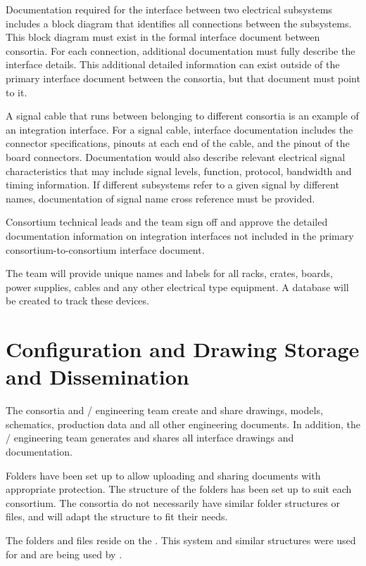 Documentation required for the interface between two electrical
subsystems includes a block diagram that identifies all connections
between the subsystems.  This block diagram must exist in the formal
interface document between consortia.  For each connection, additional
documentation must fully describe the interface details. This
additional detailed information can exist outside of the primary
interface document between the consortia, but that document must point
to it.


A signal cable that runs between  belonging to different
consortia is an example of an integration interface.  For a signal
cable, interface documentation includes the connector specifications,
pinouts at each end of the cable, and the pinout of the board
connectors.  Documentation would also describe relevant electrical
signal characteristics that may include signal levels, function,
protocol, bandwidth and timing information.  If different subsystems
refer to a given signal by different names, documentation of signal
name cross reference must be provided.

Consortium technical leads and the  team sign off
and approve the detailed documentation information on integration
interfaces not included in the primary consortium-to-consortium
interface document.

The  team will provide unique names and labels
for all racks, crates, boards, power supplies, cables and any other
electrical type equipment.  A database will be created to track these
devices.

\section{Configuration and Drawing Storage and Dissemination}
\label{sec:fdsp-coord-integ-modelplan}

The consortia and / engineering team create and share
drawings, models, schematics, production data and all other
engineering documents. In addition, the / engineering team
generates and shares all interface drawings and documentation.

Folders have been set up to allow uploading and sharing documents
with appropriate protection. The structure of the folders has been set
up to suit each consortium. The consortia do not necessarily have
similar folder structures or files, and will adapt the structure to fit
their needs.

The folders and files reside on the . This system and
similar structures were used for  and are being
used by .

